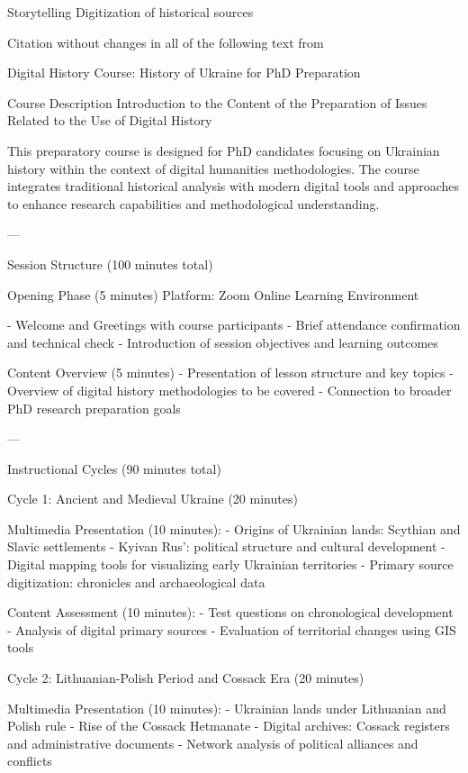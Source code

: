 Storytelling
Digitization of historical sources

Citation without changes in all of the following text from 

  Digital History Course: History of Ukraine for PhD Preparation

  Course Description
 Introduction to the Content of the Preparation of Issues Related to the Use of Digital History 

This preparatory course is designed for PhD candidates focusing on Ukrainian history within the context of digital humanities methodologies. The course integrates traditional historical analysis with modern digital tools and approaches to enhance research capabilities and methodological understanding.

---

  Session Structure (100 minutes total)

    Opening Phase (5 minutes) 
 Platform:  Zoom Online Learning Environment

-  Welcome and Greetings  with course participants
- Brief attendance confirmation and technical check
- Introduction of session objectives and learning outcomes

    Content Overview (5 minutes) 
- Presentation of lesson structure and key topics
- Overview of digital history methodologies to be covered
- Connection to broader PhD research preparation goals

---

   Instructional Cycles (90 minutes total) 

    Cycle 1: Ancient and Medieval Ukraine (20 minutes) 

 Multimedia Presentation (10 minutes): 
- Origins of Ukrainian lands: Scythian and Slavic settlements
- Kyivan Rus': political structure and cultural development
- Digital mapping tools for visualizing early Ukrainian territories
- Primary source digitization: chronicles and archaeological data

 Content Assessment (10 minutes): 
- Test questions on chronological development
- Analysis of digital primary sources
- Evaluation of territorial changes using GIS tools

    Cycle 2: Lithuanian-Polish Period and Cossack Era (20 minutes) 

 Multimedia Presentation (10 minutes): 
- Ukrainian lands under Lithuanian and Polish rule
- Rise of the Cossack Hetmanate
- Digital archives: Cossack registers and administrative documents
- Network analysis of political alliances and conflicts

